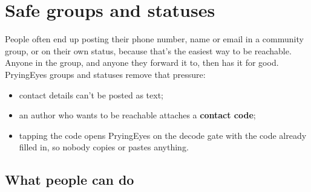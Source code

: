 \chapter{Safe groups and statuses}
\label{ch:social}

People often end up posting their phone number, name or email in a community group, or on their own status, because that's the easiest way to be reachable. Anyone in the group, and anyone they forward it to, then has it for good. PryingEyes groups and statuses remove that pressure:
\begin{itemize}
  \item contact details can't be posted as text;
  \item an author who wants to be reachable attaches a \textbf{contact code};
  \item tapping the code opens PryingEyes on the decode gate with the code already filled in, so nobody copies or pastes anything.
\end{itemize}

\section{What people can do}

